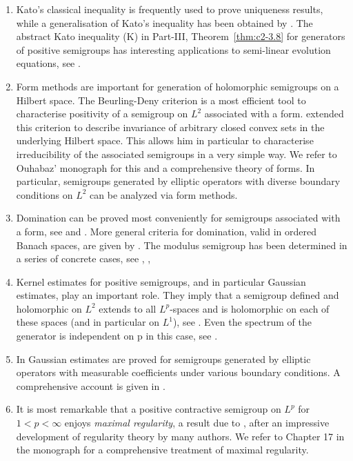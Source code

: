 \begin{enumerate}
\item
Kato's classical inequality is frequently used to prove uniqueness results, while a generalisation of Kato's inequality has been obtained by \textcite{zbmath02093937}. 
The abstract Kato inequality (K) in Part-III, Theorem~\ref{thm:c2-3.8} for generators of positive semigroups has interesting applications to semi-linear evolution equations, see \textcite{zbmath07978278}.


\item 
Form  methods are important for generation of holomorphic semigroups on a Hil\-bert space.
The Beurling-Deny criterion is a most efficient tool to characterise positivity of a semigroup on $L^{2}$ associated with a form. 
\textcite{zbmath00001168} extended this criterion to describe invariance of arbitrary closed convex sets in the underlying Hilbert space. This allows him in particular to characterise irreducibility of the associated semigroups in a very simple way. 
We refer to Ouhabaz' monograph \textcite{zbmath02168554} for this and a comprehensive theory of forms. 
In particular, semigroups generated by elliptic operators with diverse boundary conditions on $L^{2}$ can be analyzed via form methods. 

\item 
Domination can be proved most conveniently for semigroups associated with a form, see \eg \textcite{zbmath05059635} and \textcite{zbmath02168554}. 
More general criteria for domination, valid in ordered Banach spaces, are given by \textcite{zbmath05119932}.
The modulus semigroup has been determined in a series of concrete cases, see \textcite{zbmath05262326}, \textcite{zbmath02106405}, \textcite{zbmath02167818} 

\item 
Kernel estimates for positive semigroups, and in particular Gaussian estimates, play an important role. 
They imply that a semigroup defined and holomorphic on $L^{2}$ extends to all $L^{p}$-spaces and is holomorphic on each of these spaces (and in particular on $L^{1}$), see \textcite{zbmath00788452}. 
Even the spectrum of the generator is independent on p in this case, see \textcite{zbmath01344331}. 

\item
In \textcite{zbmath01538134} Gaussian estimates are proved for semigroups generated by elliptic operators with measurable coefficients under various boundary conditions. A comprehensive account is given in \textcite{zbmath02168554}.


\item 
It is most remarkable that a positive contractive semigroup on $L^{p}$ for  
\mbox{$1 < p < \infty$}  enjoys \emph{maximal regularity}, a result due to  \textcite{zbmath01661089}, after an impressive development of regularity theory by many authors.
We refer to Chapter 17 in the monograph \textcite{zbmath07784626} for a comprehensive treatment of maximal regularity. 


\end{enumerate}
